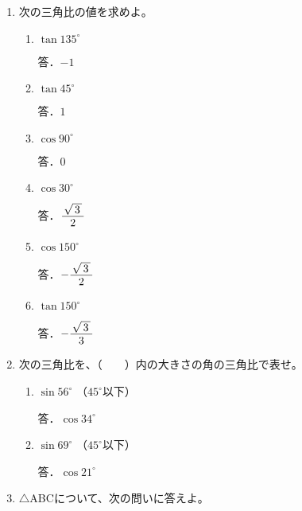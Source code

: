 \documentclass[b4paper,twocolumn]{jsarticle}
\def\nfrac#1#2{%
\displaystyle \frac{\lower.44ex\hbox{$\,#1\,$}}{\lower-.1ex\hbox{$\,#2\,$}}}%
\begin{document}
\newpage


\begin{enumerate}
\item 次の三角比の値を求めよ。

\begin{enumerate}
\item $\tan 135^\circ $
\vfill

\hfill 答．$-1$

\item $\tan 45^\circ $
\vfill

\hfill 答．$1$

\item $\cos 90^\circ $
\vfill

\hfill 答．$0$

\item $\cos 30^\circ $
\vfill

\hfill 答．$\nfrac{\sqrt{\,3\,}}{2}$

\item $\cos 150^\circ $
\vfill

\hfill 答．$-\nfrac{\sqrt{\,3\,}}{2}$

\item $\tan 150^\circ $
\vfill

\hfill 答．$-\nfrac{\sqrt{\,3\,}}{3}$

\end{enumerate}

\item 次の三角比を、（　　）内の大きさの角の三角比で表せ。

\begin{enumerate}
\item $\sin 56^\circ$ \hfill （$45^\circ$以下） \hspace{30truemm}
\vfill

\hfill 答．$\cos 34^\circ$

\item $\sin 69^\circ$ \hfill （$45^\circ$以下） \hspace{30truemm}
\vfill

\hfill 答．$\cos 21^\circ$

\end{enumerate}

\newpage

\item $\triangle$ABCについて、次の問いに答えよ。


\end{enumerate}
\end{document}
